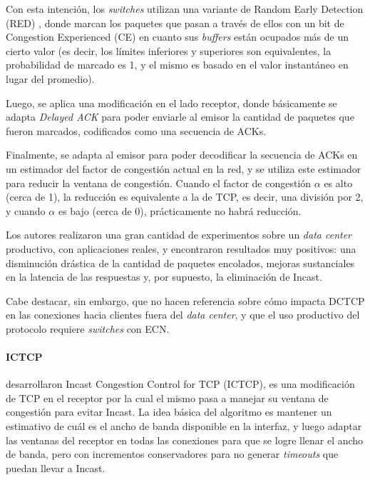 \documentclass[runningheads,a4paper]{llncs}
\begin{document}
Con esta intención, los \textit{switches} utilizan una variante de Random Early Detection (RED) \cite{Floyd_RED_1993}, donde marcan los paquetes que pasan a través de ellos con un bit de Congestion Experienced (CE) en cuanto sus \textit{buffers} están ocupados más de un cierto valor (es decir, los límites inferiores y superiores son equivalentes, la probabilidad de marcado es 1, y el mismo es basado en el valor instantáneo en lugar del promedio).

Luego, se aplica una modificación en el lado receptor, donde básicamente se adapta \textit{Delayed ACK} para poder enviarle al emisor la cantidad de paquetes que fueron marcados, codificados como una secuencia de ACKs.

Finalmente, se adapta al emisor para poder decodificar la secuencia de ACKs en un estimador del factor de congestión actual en la red, y se utiliza este estimador para reducir la ventana de congestión. Cuando el factor de congestión $\alpha$ es alto (cerca de 1), la reducción es equivalente a la de TCP, es decir, una división por 2, y cuando $\alpha$ es bajo (cerca de 0), prácticamente no habrá reducción.

Los autores realizaron una gran cantidad de experimentos sobre un \textit{data center} productivo, con aplicaciones reales, y encontraron resultados muy positivos: una disminución drástica de la cantidad de paquetes encolados, mejoras sustanciales en la latencia de las respuestas y, por supuesto, la eliminación de Incast.

Cabe destacar, sin embargo, que no hacen referencia sobre cómo impacta DCTCP en las conexiones hacia clientes fuera del \textit{data center}, y que el uso productivo del protocolo requiere \textit{switches} con ECN.

\paragraph{ICTCP}

\citet{Wu_ICTCP_2010} desarrollaron Incast Congestion Control for TCP (ICTCP), es una modificación de TCP en el receptor por la cual el mismo pasa a manejar su ventana de congestión para evitar Incast. La idea básica del algoritmo es mantener un estimativo de cuál es el ancho de banda disponible en la interfaz, y luego adaptar las ventanas del receptor en todas las conexiones para que se logre llenar el ancho de banda, pero con incrementos conservadores para no generar \textit{timeouts} que puedan llevar a Incast.
\end{document}

